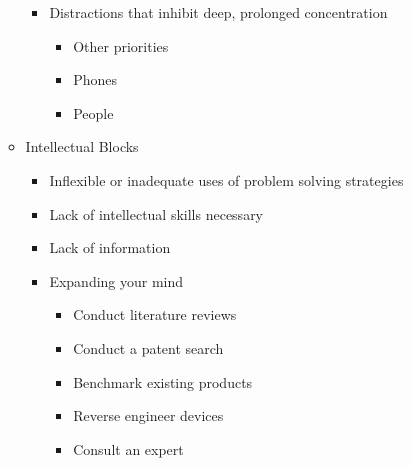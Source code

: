 \begin{itemize}
\begin{itemize}
        \begin{itemize}

          \item Distractions that inhibit deep, prolonged concentration

            \begin{itemize}

              \item Other priorities

              \item Phones

              \item People

            \end{itemize}

        \end{itemize}

      \item Intellectual Blocks

        \begin{itemize}

          \item Inflexible or inadequate uses of problem solving strategies

          \item Lack of intellectual skills necessary

          \item Lack of information

          \item Expanding your mind

            \begin{itemize}

              \item Conduct literature reviews

              \item Conduct a patent search

              \item Benchmark existing products

              \item Reverse engineer devices

              \item Consult an expert

            \end{itemize}

        \end{itemize}


\end{itemize}
\end{itemize}
